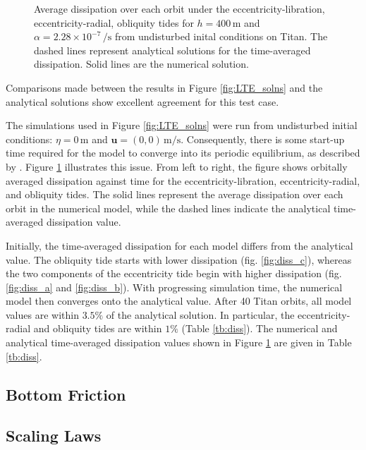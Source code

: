 \begin{figure}[!t]
\begin{subfigure}{\linewidth}
\subcaption{\label{fig:diss_c}}
\end{subfigure}
\vspace*{-0.8cm}
\caption{Average dissipation over each orbit under the eccentricity-libration, eccentricity-radial, obliquity tides for $h = 400 \, \si{\metre}$ and $\alpha = 2.28 \times 10^{-7} \, \si{\per\second}$ from undisturbed inital conditions on Titan. The dashed lines represent analytical solutions for the time-averaged dissipation. Solid lines are the numerical solution. \label{fig:diss}}
\end{figure}

Comparisons made between the results in Figure \ref{fig:LTE_solns} and the analytical solutions show excellent agreement for this test case.

The simulations used in Figure \ref{fig:LTE_solns} were run from undisturbed initial conditions: \hbox{$\eta = 0 \, \si{\metre}$} and \hbox{$\bm{u} = (0,0) \, \si{\metre\per\second}$}. Consequently, there is some start-up time required for the model to converge into its periodic equilibrium, as described by \citet{sears1995tidal}. Figure \ref{fig:diss} illustrates this issue. From left to right, the figure shows orbitally averaged dissipation against time for the eccentricity-libration, eccentricity-radial, and obliquity tides.  The solid lines represent the average dissipation over each orbit in the numerical model, while the dashed lines indicate the analytical time-averaged dissipation value. 

Initially, the time-averaged dissipation for each model differs from the analytical value. The obliquity tide starts with lower dissipation (fig. \ref{fig:diss_c}), whereas the two components of the eccentricity tide begin with higher dissipation (fig. \ref{fig:diss_a} and \ref{fig:diss_b}). With progressing simulation time, the numerical model then converges onto the analytical value. After 40 Titan orbits, all model values are within $3.5 \si{\percent}$ of the analytical solution. In particular, the eccentricity-radial and obliquity tides are within $1 \si{\percent}$ (Table \ref{tb:diss}). The numerical and analytical time-averaged dissipation values shown in Figure \ref{fig:diss} are given in Table \ref{tb:diss}.



\subsection{Bottom Friction \label{subsec:result_bottom}}

\subsection{Scaling Laws \label{subsec:scaling}}